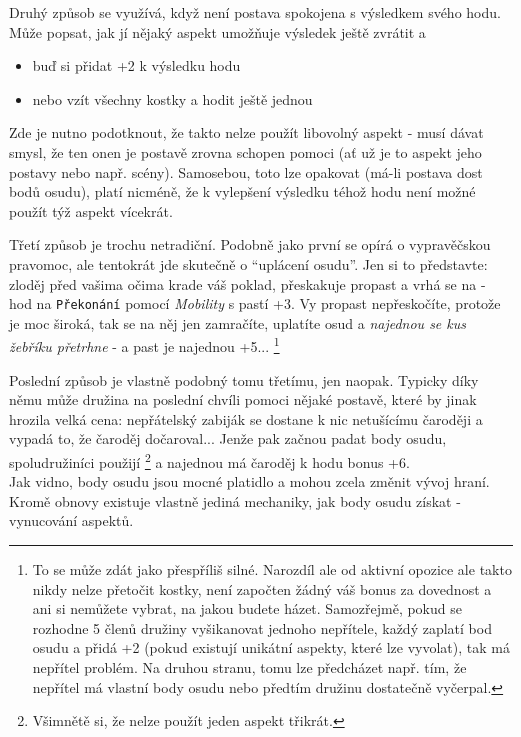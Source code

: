 \documentclass[../main.tex]{subfiles}
\begin{document}
Druhý způsob se využívá, když není postava spokojena s výsledkem svého hodu. Může popsat, jak jí nějaký aspekt umožňuje výsledek ještě zvrátit a

\begin{itemize}
\item buď si přidat +2 k výsledku hodu
\item nebo vzít všechny kostky a hodit ještě jednou
\end{itemize}

Zde je nutno podotknout, že takto nelze použít libovolný aspekt - musí dávat smysl, že ten onen je postavě zrovna schopen pomoci (ať už je to aspekt jeho postavy nebo např. scény). Samosebou, toto lze opakovat (má-li postava dost bodů osudu), platí nicméně, že k vylepšení výsledku téhož hodu není možné použít týž aspekt vícekrát.

Třetí způsob je trochu netradiční. Podobně jako první se opírá o vypravěčskou pravomoc, ale tentokrát jde skutečně o ``uplácení osudu''. Jen si to představte: zloděj před vašima očima krade váš poklad, přeskakuje propast a vrhá se na  - hod na \texttt{Překonání} pomocí \textit{Mobility} s pastí +3. Vy propast nepřeskočíte, protože je moc široká, tak se na něj jen zamračíte, uplatíte osud a \textit{najednou se kus žebříku přetrhne} - a past je najednou +5... \footnote{To se může zdát jako přespříliš silné. Narozdíl ale od aktivní opozice ale takto nikdy nelze přetočit kostky, není započten žádný váš bonus za dovednost a ani si nemůžete vybrat, na jakou budete házet. Samozřejmě, pokud se rozhodne 5 členů družiny vyšikanovat jednoho nepřítele, každý zaplatí bod osudu a přidá +2 (pokud existují unikátní aspekty, které lze vyvolat), tak má nepřítel problém. Na druhou stranu, tomu lze předcházet např. tím, že nepřítel má vlastní body osudu nebo předtím družinu dostatečně vyčerpal.}

Poslední způsob je vlastně podobný tomu třetímu, jen naopak. Typicky díky němu může družina na poslední chvíli pomoci nějaké postavě, které by jinak hrozila velká cena: nepřátelský zabiják se dostane k nic netušícímu čaroději a vypadá to, že čaroděj dočaroval... Jenže pak začnou padat body osudu, spoludružiníci použijí  \footnote{Všimnětě si, že nelze použít jeden aspekt třikrát.} a najednou má čaroděj k hodu bonus +6. \\

Jak vidno, body osudu jsou mocné platidlo a mohou zcela změnit vývoj hraní. Kromě obnovy existuje vlastně jediná mechaniky, jak body osudu získat - vynucování aspektů.
\end{document}
